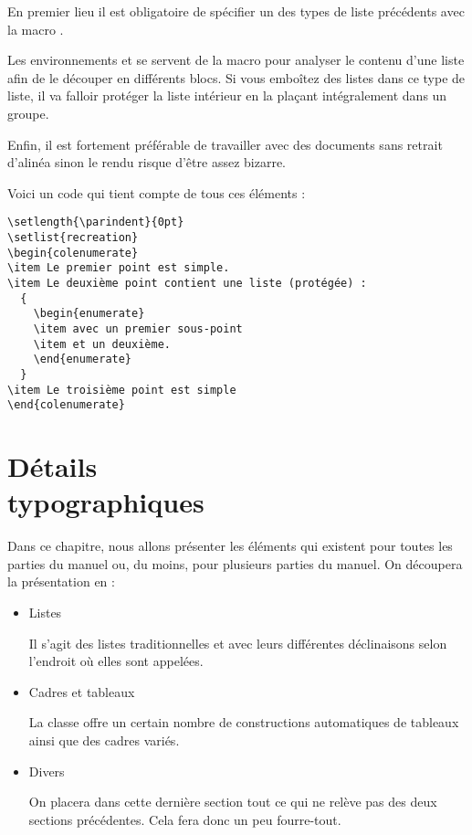 \documentclass[nocrop]{sesamanuel}
\begin{document}
En premier lieu il est obligatoire de spécifier un des types de liste
précédents avec la macro .

Les environnements  et  se
servent de la macro  pour analyser le contenu d'une liste
afin de le découper en différents blocs. Si vous emboîtez des listes
dans ce type de liste, il va falloir protéger la liste intérieur en la
plaçant intégralement dans un groupe.

Enfin, il est fortement préférable de travailler avec des documents
sans retrait d'alinéa sinon le rendu risque d'être assez bizarre.

Voici un code qui tient compte de tous ces éléments :
\begin{verbatim}
\setlength{\parindent}{0pt}
\setlist{recreation}
\begin{colenumerate}
\item Le premier point est simple.
\item Le deuxième point contient une liste (protégée) :
  {
    \begin{enumerate}
    \item avec un premier sous-point
    \item et un deuxième.
    \end{enumerate}
  }
\item Le troisième point est simple
\end{colenumerate}
\end{verbatim}

\chapter{Détails\\ typographiques}\label{chDetails}
\label{chap-details-typographiques}
\begin{prerequis}
  Dans ce chapitre, nous allons présenter les éléments qui existent
  pour toutes les parties du manuel ou, du moins, pour plusieurs
  parties du manuel. On découpera la présentation en :
  \begin{itemize}
  \item Listes

    Il s'agit des listes traditionnelles  et
     avec leurs différentes déclinaisons selon
    l'endroit où elles sont appelées.
  \item Cadres et tableaux

    La classe offre un certain nombre de constructions automatiques
    de tableaux ainsi que des cadres variés.
  \item Divers

    On placera dans cette dernière section tout ce qui ne relève pas
    des deux sections précédentes. Cela fera donc un peu fourre-tout.
  \end{itemize}
\end{prerequis}
\end{document}
